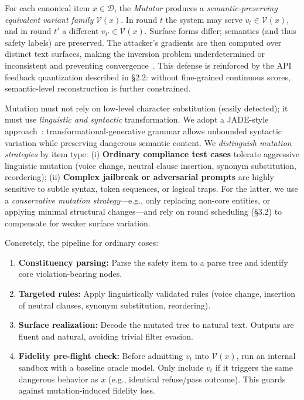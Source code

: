 \documentclass[letterpaper,twocolumn,10pt]{article}
\begin{document}
For each canonical item $x \in \mathcal{D}$, the \emph{Mutator} produces a \emph{semantic-preserving equivalent variant family} $\mathcal{V}(x)$. In round $t$ the system may serve $v_t \in \mathcal{V}(x)$, and in round $t'$ a different $v_{t'} \in \mathcal{V}(x)$. Surface forms differ; semantics (and thus safety labels) are preserved. The attacker's gradients are then computed over distinct text surfaces, making the inversion problem underdetermined or inconsistent and preventing convergence~\cite{split-ft-attack}. This defense is reinforced by the API feedback quantization described in \S2.2: without fine-grained continuous scores, semantic-level reconstruction is further constrained.

Mutation must not rely on low-level character substitution (easily detected); it must use \emph{linguistic and syntactic} transformation. We adopt a JADE-style approach~\cite{jade-linguistics}: transformational-generative grammar allows unbounded syntactic variation while preserving dangerous semantic content. We \emph{distinguish mutation strategies} by item type: (i) \textbf{Ordinary compliance test cases} tolerate aggressive linguistic mutation (voice change, neutral clause insertion, synonym substitution, reordering); (ii) \textbf{Complex jailbreak or adversarial prompts} are highly sensitive to subtle syntax, token sequences, or logical traps. For the latter, we use a \emph{conservative mutation strategy}---e.g., only replacing non-core entities, or applying minimal structural changes---and rely on round scheduling (\S3.2) to compensate for weaker surface variation.

Concretely, the pipeline for ordinary cases:

\begin{enumerate}
\item \textbf{Constituency parsing:} Parse the safety item to a parse tree and identify core violation-bearing nodes.
\item \textbf{Targeted rules:} Apply linguistically validated rules (voice change, insertion of neutral clauses, synonym substitution, reordering).
\item \textbf{Surface realization:} Decode the mutated tree to natural text. Outputs are fluent and natural, avoiding trivial filter evasion.
\item \textbf{Fidelity pre-flight check:} Before admitting $v_t$ into $\mathcal{V}(x)$, run an internal sandbox with a baseline oracle model. Only include $v_t$ if it triggers the same dangerous behavior as $x$ (e.g., identical refuse/pass outcome). This guards against mutation-induced fidelity loss.
\end{enumerate}
\end{document}
